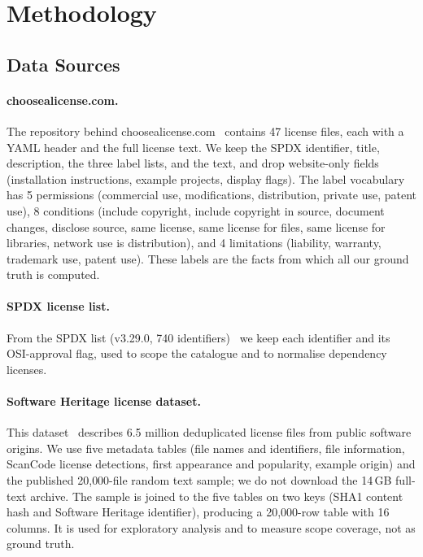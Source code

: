 \section{Methodology}
\label{s:method}

\subsection{Data Sources}
\label{ss:data}

\paragraph{choosealicense.com.} The repository behind choosealicense.com~\cite{choosealicense} contains 47 license files, each with a YAML header and the full license text. We keep the SPDX identifier, title, description, the three label lists, and the text, and drop website-only fields (installation instructions, example projects, display flags). The label vocabulary has 5 permissions (commercial use, modifications, distribution, private use, patent use), 8 conditions (include copyright, include copyright in source, document changes, disclose source, same license, same license for files, same license for libraries, network use is distribution), and 4 limitations (liability, warranty, trademark use, patent use). These labels are the facts from which all our ground truth is computed.

\paragraph{SPDX license list.} From the SPDX list (v3.29.0, 740 identifiers)~\cite{spdx} we keep each identifier and its OSI-approval flag, used to scope the catalogue and to normalise dependency licenses.

\paragraph{Software Heritage license dataset.} This dataset~\cite{zacchiroli2022dataset} describes 6.5 million deduplicated license files from public software origins. We use five metadata tables (file names and identifiers, file information, ScanCode license detections, first appearance and popularity, example origin) and the published 20{,}000-file random text sample; we do not download the 14\,GB full-text archive. The sample is joined to the five tables on two keys (SHA1 content hash and Software Heritage identifier), producing a 20{,}000-row table with 16 columns. It is used for exploratory analysis and to measure scope coverage, not as ground truth.

